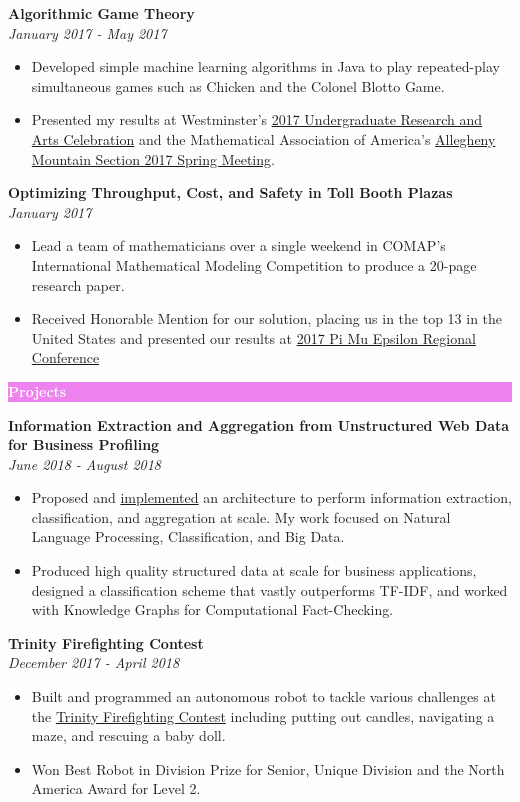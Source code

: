 \documentclass[letterpaper,11pt]{article}
\newcommand{\resitem}[1]{\item #1 \vspace{-2pt}}
\newcommand{\resheading}[1]{{\large \colorbox{violet}{\begin{minipage}{\textwidth}{\textbf{#1 \vphantom{p\^{E}}}}\end{minipage}}}}
\begin{document}
		\textbf{Algorithmic Game Theory} \\ \textit{January 2017 - May 2017}
		\begin{itemize}[topsep=3pt, itemsep=1pt]
			\resitem{Developed simple machine learning algorithms in Java to play repeated-play simultaneous games such as Chicken and the Colonel Blotto Game.}
			\resitem{Presented my results at Westminster's \href{https://alexandermichels.github.io/docs/2017-urac-schedule.pdf}{2017 Undergraduate Research and Arts Celebration} and the Mathematical Association of America's \href{https://alexandermichels.github.io/docs/MAA2017Abstracts.pdf}{Allegheny Mountain Section 2017 Spring Meeting}.}
		\end{itemize}
	
		\textbf{Optimizing Throughput, Cost, and Safety in Toll Booth Plazas} \\ \textit{January 2017}
		\begin{itemize}[topsep=3pt, itemsep=1pt]
			\resitem{Lead a team of mathematicians over a single weekend in COMAP's International Mathematical Modeling Competition to produce a 20-page research paper.}
			\resitem{Received Honorable Mention for our solution, placing us in the top 13 in the United States and presented our results at \href{https://alexandermichels.github.io/docs/PME2017Program.pdf}{2017 Pi Mu Epsilon Regional Conference}}
		\end{itemize}
	
	\resheading{\textcolor{white}{Projects}}
	
			\vspace{0.1in}
			
		\textbf{Information Extraction and Aggregation from Unstructured Web Data for Business Profiling} \\ \textit{June 2018 - August 2018}
		\begin{itemize}[topsep=3pt, itemsep=1pt]
			\resitem{Proposed and \href{https://github.com/himahuja/pcatxcore}{implemented} an architecture to perform information extraction, classification, and aggregation at scale. My work focused on Natural Language Processing, Classification, and Big Data.}
			\resitem{Produced high quality structured data at scale for business applications, designed a classification scheme that vastly outperforms TF-IDF, and worked with Knowledge Graphs for Computational Fact-Checking.}
		\end{itemize}
	
	\textbf{Trinity Firefighting Contest} \\ \textit{December 2017 - April 2018}
	\begin{itemize}[topsep=3pt, itemsep=1pt]
		\resitem{Built and programmed an autonomous robot to tackle various challenges at the \href{https://trinityrobotcontest.org/}{Trinity Firefighting Contest} including putting out candles, navigating a maze, and rescuing a baby doll.}
		\resitem{Won Best Robot in Division Prize for Senior, Unique Division and the North America Award for Level 2.}
	\end{itemize}
	
\end{document}
